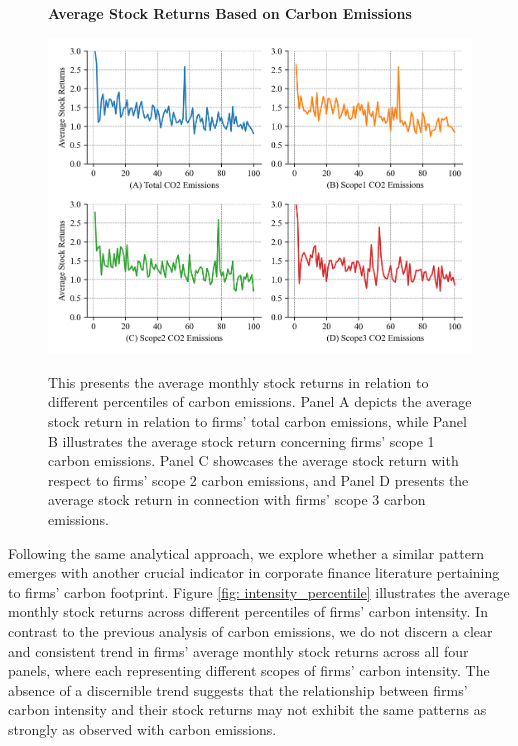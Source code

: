 \documentclass[12pt]{article}
\begin{document}
\begin{figure}[!ht]
\centering
\caption{\textbf{Average Stock Returns Based on Carbon Emissions}}
\includegraphics{graphics/co2_percentile.png}
\label{fig: co2_percentile}
\caption*{\footnotesize{This presents the average monthly stock returns in relation to different percentiles of carbon emissions. Panel A depicts the average stock return in relation to firms' total carbon emissions, while Panel B illustrates the average stock return concerning firms' scope 1 carbon emissions. Panel C showcases the average stock return with respect to firms' scope 2 carbon emissions, and Panel D presents the average stock return in connection with firms' scope 3 carbon emissions.}}
\end{figure}

Following the same analytical approach, we explore whether a similar pattern emerges with another crucial indicator in corporate finance literature pertaining to firms' carbon footprint. Figure \ref{fig: intensity_percentile} illustrates the average monthly stock returns across different percentiles of firms' carbon intensity. In contrast to the previous analysis of carbon emissions, we do not discern a clear and consistent trend in firms' average monthly stock returns across all four panels, where each representing different scopes of firms' carbon intensity. The absence of a discernible trend suggests that the relationship between firms' carbon intensity and their stock returns may not exhibit the same patterns as strongly as observed with carbon emissions. 
\end{document}
